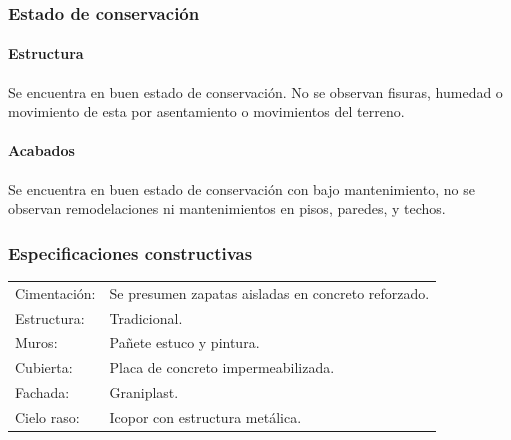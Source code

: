 \documentclass[12pt,a4paper,twoside]{article}
\begin{document}
{\subsubsection{Estado de conservación}
%
\paragraph{Estructura}
%
 Se encuentra  en buen estado de conservación. No se observan fisuras, humedad o movimiento de esta por asentamiento o movimientos del terreno.	
%
\paragraph{Acabados}
%
Se encuentra  en buen estado de conservación con bajo mantenimiento, no se observan remodelaciones ni mantenimientos en pisos, paredes, y techos.
%
\subsubsection{Especificaciones constructivas}
%
\begin{tabular}{ l l }
%
   Cimentación: & Se presumen zapatas aisladas en concreto reforzado.\\
   Estructura: & Tradicional.\\
  Muros: & Pañete estuco y pintura.\\
  Cubierta: & Placa de concreto impermeabilizada.\\ %
   Fachada: & Graniplast.\\
   Cielo raso: & Icopor con estructura metálica.\\
%          
 \end{tabular}
%
%
%
}
\end{document}
